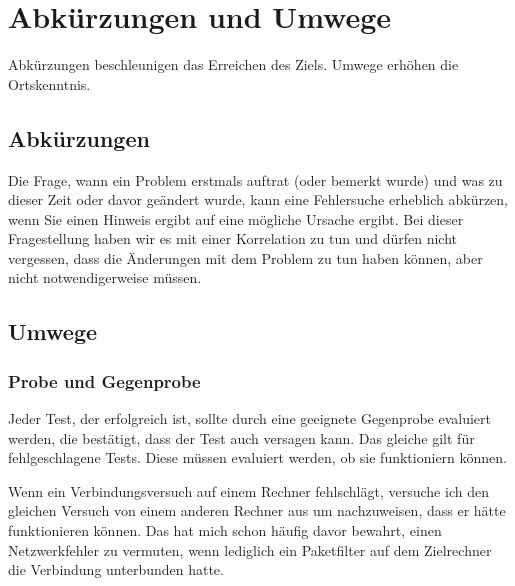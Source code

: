 \section{Abkürzungen und Umwege}
\label{sec:abkuerzung-umweg}

\begin{abstractsec}
  Abkürzungen beschleunigen das Erreichen des Ziels. Umwege erhöhen die
  Ortskenntnis.
\end{abstractsec}

\begin{normaltext}

\subsection{Abkürzungen}
\label{sec:abkuerzungen}

Die Frage, wann ein Problem erstmals auftrat (oder bemerkt wurde) und was zu
dieser Zeit oder davor geändert wurde, kann eine Fehlersuche erheblich
abkürzen, wenn Sie einen Hinweis ergibt auf eine mögliche Ursache ergibt. Bei
dieser Fragestellung haben wir es mit einer Korrelation zu tun und dürfen
nicht vergessen, dass die Änderungen mit dem Problem zu tun haben können, aber
nicht notwendigerweise müssen.

\subsection{Umwege}
\label{sec:umwege}

\subsubsection{Probe und Gegenprobe}

Jeder Test, der erfolgreich ist, sollte durch eine geeignete Gegenprobe
evaluiert werden, die bestätigt, dass der Test auch versagen kann. Das gleiche
gilt für fehlgeschlagene Tests. Diese müssen evaluiert werden, ob sie
funktioniern können.

Wenn ein Verbindungsversuch auf einem Rechner fehlschlägt, versuche ich den
gleichen Versuch von einem anderen Rechner aus um nachzuweisen, dass er hätte
funktionieren können. Das hat mich schon häufig davor bewahrt, einen
Netzwerkfehler zu vermuten, wenn lediglich ein Paketfilter auf dem Zielrechner
die Verbindung unterbunden hatte.
\end{normaltext}


